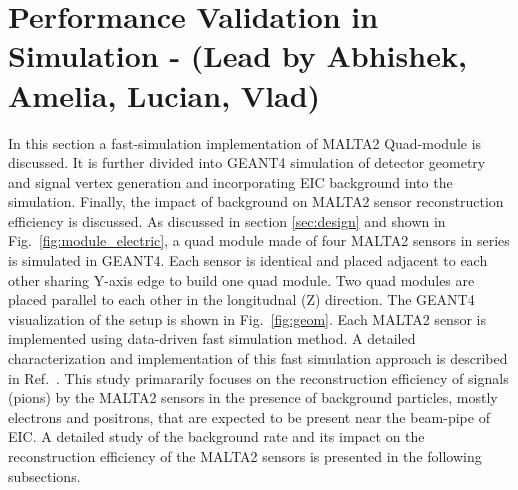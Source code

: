 \section{Performance Validation in Simulation - (Lead by Abhishek, Amelia, Lucian, Vlad)}\label{sec:mc}

In this section a fast-simulation implementation of MALTA2 Quad-module is discussed. It is further divided into GEANT4 simulation of detector geometry and signal vertex generation and incorporating EIC background into the simulation. Finally, the impact of background on MALTA2 sensor reconstruction efficiency is discussed.
As discussed in section \ref{sec:design} and shown in Fig.~\ref{fig:module_electric}, a quad module made of four MALTA2 sensors in series is simulated in GEANT4.
Each sensor is identical and placed adjacent to each other sharing Y-axis edge to build one quad module. Two quad modules are placed parallel to each other in the longitudnal (Z) direction. The GEANT4 visualization of the setup is shown in Fig.~\ref{fig:geom}. Each MALTA2 sensor is implemented using data-driven fast simulation method. 
A detailed characterization and implementation of this fast simulation approach is described in Ref.~\cite{FastSim}.
This study primararily focuses on the reconstruction efficiency of signals (pions) by the MALTA2 sensors in the presence of background particles, mostly electrons and positrons, that are expected to be present near the beam-pipe of EIC. A detailed study of the background rate and its impact on the reconstruction efficiency of the MALTA2 sensors is presented in the following subsections.

